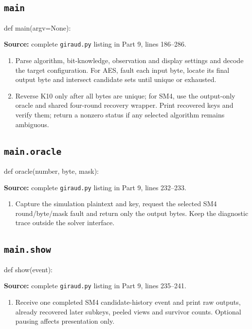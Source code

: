 \subsection{\texttt{main}}
\begin{lightcode}
def main(argv=None):
\end{lightcode}
\noindent\textbf{Source:} complete \texttt{giraud.py} listing in Part 9, lines 186--286.
\begin{enumerate}
\item Parse algorithm, bit-knowledge, observation and display settings and decode the target configuration. For AES, fault each input byte, locate its final output byte and intersect candidate sets until unique or exhausted.
\item Reverse K10 only after all bytes are unique; for SM4, use the output-only oracle and shared four-round recovery wrapper. Print recovered keys and verify them; return a nonzero status if any selected algorithm remains ambiguous.
\end{enumerate}
\subsection{\texttt{main.oracle}}
\begin{lightcode}
def oracle(number, byte, mask):
\end{lightcode}
\noindent\textbf{Source:} complete \texttt{giraud.py} listing in Part 9, lines 232--233.
\begin{enumerate}
\item Capture the simulation plaintext and key, request the selected SM4 round/byte/mask fault and return only the output bytes. Keep the diagnostic trace outside the solver interface.
\end{enumerate}
\subsection{\texttt{main.show}}
\begin{lightcode}
def show(event):
\end{lightcode}
\noindent\textbf{Source:} complete \texttt{giraud.py} listing in Part 9, lines 235--241.
\begin{enumerate}
\item Receive one completed SM4 candidate-history event and print raw outputs, already recovered later subkeys, peeled views and survivor counts. Optional pausing affects presentation only.
\end{enumerate}
